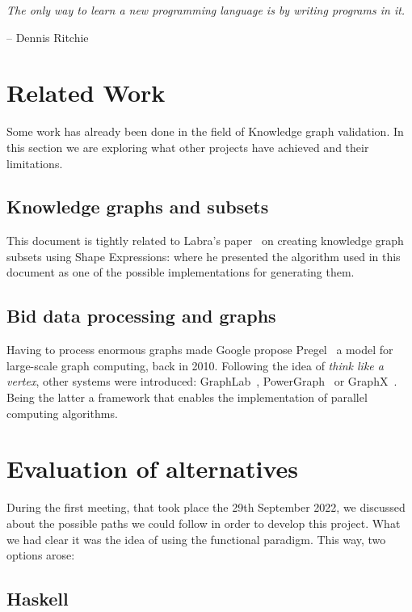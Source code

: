 \epigraph{\textit{The only way to learn a new programming language is by writing programs in it.}}{-- \textup{Dennis Ritchie}}

\section{Related Work}

Some work has already been done in the field of Knowledge graph validation. In this section we are exploring what other projects have achieved and their limitations.

\subsection{Knowledge graphs and subsets}

This document is tightly related to Labra's paper~\cite{https://doi.org/10.48550/arxiv.2110.11709} on creating knowledge graph subsets using Shape Expressions: where he presented the algorithm used in this document as one of the possible implementations for generating them.

\subsection{Bid data processing and graphs}

Having to process enormous graphs made Google propose Pregel~\cite{10.1145/1807167.1807184} a model for large-scale graph computing, back in 2010. Following the idea of \textit{think like a vertex}, other systems were introduced: GraphLab~\cite{10.14778/2212351.2212354}, PowerGraph~\cite{180251} or GraphX~\cite{186216}. Being the latter a framework that enables the implementation of parallel computing algorithms.

\section{Evaluation of alternatives}

During the first meeting, that took place the 29th September 2022, we discussed about the possible paths we could follow in order to develop this project. What we had clear it was the idea of using the functional paradigm. This way, two options arose:

\subsection{Haskell}

